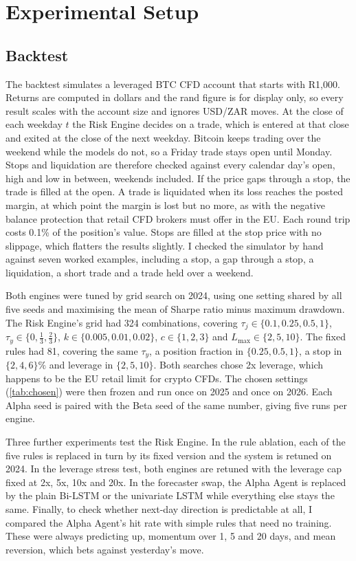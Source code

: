 \section{Experimental Setup}\label{sec:setup}

\subsection{Backtest}\label{sec:backtest}

The backtest simulates a leveraged BTC CFD account that starts with R1{,}000. Returns are computed in dollars and the rand figure is for display only, so every result scales with the account size and ignores USD/ZAR moves. At the close of each weekday $t$ the Risk Engine decides on a trade, which is entered at that close and exited at the close of the next weekday. Bitcoin keeps trading over the weekend while the models do not, so a Friday trade stays open until Monday. Stops and liquidation are therefore checked against every calendar day's open, high and low in between, weekends included. If the price gaps through a stop, the trade is filled at the open. A trade is liquidated when its loss reaches the posted margin, at which point the margin is lost but no more, as with the negative balance protection that retail CFD brokers must offer in the EU. Each round trip costs 0.1\% of the position's value. Stops are filled at the stop price with no slippage, which flatters the results slightly. I checked the simulator by hand against seven worked examples, including a stop, a gap through a stop, a liquidation, a short trade and a trade held over a weekend.

Both engines were tuned by grid search on 2024, using one setting shared by all five seeds and maximising the mean of Sharpe ratio minus maximum drawdown. The Risk Engine's grid had 324 combinations, covering $\tau_j \in \{0.1, 0.25, 0.5, 1\}$, $\tau_y \in \{0, \tfrac13, \tfrac23\}$, $k \in \{0.005, 0.01, 0.02\}$, $c \in \{1, 2, 3\}$ and $L_{\max} \in \{2, 5, 10\}$. The fixed rules had 81, covering the same $\tau_y$, a position fraction in $\{0.25, 0.5, 1\}$, a stop in $\{2, 4, 6\}\%$ and leverage in $\{2, 5, 10\}$. Both searches chose 2x leverage, which happens to be the EU retail limit for crypto CFDs. The chosen settings (\cref{tab:chosen}) were then frozen and run once on 2025 and once on 2026. Each Alpha seed is paired with the Beta seed of the same number, giving five runs per engine.

Three further experiments test the Risk Engine. In the rule ablation, each of the five rules is replaced in turn by its fixed version and the system is retuned on 2024. In the leverage stress test, both engines are retuned with the leverage cap fixed at 2x, 5x, 10x and 20x. In the forecaster swap, the Alpha Agent is replaced by the plain Bi-LSTM or the univariate LSTM while everything else stays the same. Finally, to check whether next-day direction is predictable at all, I compared the Alpha Agent's hit rate with simple rules that need no training. These were always predicting up, momentum over 1, 5 and 20 days, and mean reversion, which bets against yesterday's move.

